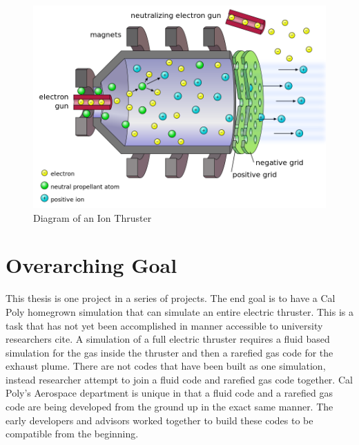 \begin{figure}
    \includegraphics[width=.85\textwidth]{figures/ion_thruster.png}
    \centering
    \caption{Diagram of an Ion Thruster \cite{ion_thruster} }
    \label{fig:ion_thruster}
\end{figure}




\section{Overarching Goal}
This thesis is one project in a series of projects. The end goal is to have a Cal Poly homegrown simulation that can simulate an entire electric thruster. This is a task that has not yet been accomplished in manner accessible to university researchers cite{}. A simulation of a full electric thruster requires a fluid based simulation for the gas inside the thruster and then a rarefied gas code for the exhaust plume. There are not codes that have been built as one simulation, instead researcher attempt to join a fluid code and rarefied gas code together. Cal Poly’s Aerospace department is unique in that a fluid code and a rarefied gas code are being developed from the ground up in the exact same manner. The early developers and advisors worked together to build these codes to be compatible from the beginning. \par

